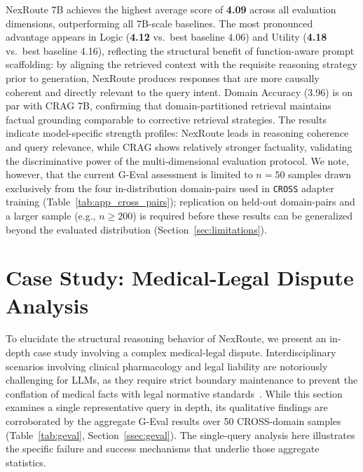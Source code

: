 \documentclass[a4paper,fleql]{cas-sc}
\begin{document}
NexRoute 7B achieves the highest average score of \textbf{4.09} across all
evaluation dimensions, outperforming all 7B-scale baselines. The most
pronounced advantage appears in Logic (\textbf{4.12} vs.\ best baseline
4.06) and Utility (\textbf{4.18} vs.\ best baseline 4.16), reflecting the
structural benefit of function-aware prompt scaffolding: by aligning the
retrieved context with the requisite reasoning strategy prior to generation,
NexRoute produces responses that are more causally coherent and directly
relevant to the query intent. Domain Accuracy (3.96) is on par with CRAG 7B,
confirming that domain-partitioned retrieval maintains factual grounding
comparable to corrective retrieval strategies. The results indicate model-specific strength profiles: NexRoute leads in
reasoning coherence and query relevance, while CRAG shows relatively
stronger factuality, validating the discriminative power of the
multi-dimensional evaluation protocol.
We note, however, that the current G-Eval assessment is limited to
$n{=}50$ samples drawn exclusively from the four in-distribution domain-pairs
used in \texttt{CROSS} adapter training (Table~\ref{tab:app_cross_pairs});
replication on held-out domain-pairs and a larger sample (e.g.,
$n{\geq}200$) is required before these results can be generalized beyond the
evaluated distribution (Section~\ref{sec:limitations}).

\section{Case Study: Medical-Legal Dispute Analysis}
\label{sec:casestudy}
To elucidate the structural reasoning behavior of NexRoute, we present an
in-depth case study involving a complex medical-legal dispute. Interdisciplinary
scenarios involving clinical pharmacology and legal liability are notoriously
challenging for LLMs, as they require strict boundary maintenance to prevent
the conflation of medical facts with legal normative
standards~\citep{singhal2023large, guha2023legalbench}. While this section
examines a single representative query in depth, its qualitative findings are
corroborated by the aggregate G-Eval results over 50 CROSS-domain samples
(Table~\ref{tab:geval}, Section~\ref{ssec:geval}).
The single-query analysis here illustrates the specific failure and success
mechanisms that underlie those aggregate statistics.
\end{document}
